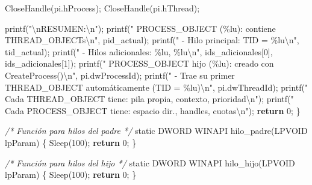 \documentclass[
  spanish,
]{article}
\newenvironment{Shaded}{}{}
\newcommand{\CommentTok}[1]{\textcolor[rgb]{0.38,0.63,0.69}{\textit{#1}}}
\newcommand{\ControlFlowTok}[1]{\textcolor[rgb]{0.00,0.44,0.13}{\textbf{#1}}}
\newcommand{\DataTypeTok}[1]{\textcolor[rgb]{0.56,0.13,0.00}{#1}}
\newcommand{\DecValTok}[1]{\textcolor[rgb]{0.25,0.63,0.44}{#1}}
\newcommand{\NormalTok}[1]{#1}
\newcommand{\OperatorTok}[1]{\textcolor[rgb]{0.40,0.40,0.40}{#1}}
\newcommand{\SpecialCharTok}[1]{\textcolor[rgb]{0.25,0.44,0.63}{#1}}
\newcommand{\StringTok}[1]{\textcolor[rgb]{0.25,0.44,0.63}{#1}}
\begin{document}
\begin{Shaded}
\begin{Highlighting}[]
\NormalTok{    CloseHandle}\OperatorTok{(}\NormalTok{pi}\OperatorTok{.}\NormalTok{hProcess}\OperatorTok{);}
\NormalTok{    CloseHandle}\OperatorTok{(}\NormalTok{pi}\OperatorTok{.}\NormalTok{hThread}\OperatorTok{);}

\NormalTok{    printf}\OperatorTok{(}\StringTok{"}\SpecialCharTok{\textbackslash{}n}\StringTok{RESUMEN:}\SpecialCharTok{\textbackslash{}n}\StringTok{"}\OperatorTok{);}
\NormalTok{    printf}\OperatorTok{(}\StringTok{"  PROCESS\_OBJECT (}\SpecialCharTok{\%lu}\StringTok{): contiene THREAD\_OBJECTs}\SpecialCharTok{\textbackslash{}n}\StringTok{"}\OperatorTok{,}\NormalTok{ pid\_actual}\OperatorTok{);}
\NormalTok{    printf}\OperatorTok{(}\StringTok{"    {-} Hilo principal: TID = }\SpecialCharTok{\%lu\textbackslash{}n}\StringTok{"}\OperatorTok{,}\NormalTok{ tid\_actual}\OperatorTok{);}
\NormalTok{    printf}\OperatorTok{(}\StringTok{"    {-} Hilos adicionales: }\SpecialCharTok{\%lu}\StringTok{, }\SpecialCharTok{\%lu\textbackslash{}n}\StringTok{"}\OperatorTok{,}
\NormalTok{           ids\_adicionales}\OperatorTok{[}\DecValTok{0}\OperatorTok{],}\NormalTok{ ids\_adicionales}\OperatorTok{[}\DecValTok{1}\OperatorTok{]);}
\NormalTok{    printf}\OperatorTok{(}\StringTok{"  PROCESS\_OBJECT hijo (}\SpecialCharTok{\%lu}\StringTok{): creado con CreateProcess()}\SpecialCharTok{\textbackslash{}n}\StringTok{"}\OperatorTok{,}
\NormalTok{           pi}\OperatorTok{.}\NormalTok{dwProcessId}\OperatorTok{);}
\NormalTok{    printf}\OperatorTok{(}\StringTok{"    {-} Trae su primer THREAD\_OBJECT automáticamente (TID = }\SpecialCharTok{\%lu}\StringTok{)}\SpecialCharTok{\textbackslash{}n}\StringTok{"}\OperatorTok{,}
\NormalTok{           pi}\OperatorTok{.}\NormalTok{dwThreadId}\OperatorTok{);}
\NormalTok{    printf}\OperatorTok{(}\StringTok{"  Cada THREAD\_OBJECT tiene: pila propia, contexto, prioridad}\SpecialCharTok{\textbackslash{}n}\StringTok{"}\OperatorTok{);}
\NormalTok{    printf}\OperatorTok{(}\StringTok{"  Cada PROCESS\_OBJECT tiene: espacio dir., handles, cuotas}\SpecialCharTok{\textbackslash{}n}\StringTok{"}\OperatorTok{);}
    \ControlFlowTok{return} \DecValTok{0}\OperatorTok{;}
\OperatorTok{\}}

\CommentTok{/* Función para hilos del padre */}
\DataTypeTok{static}\NormalTok{ DWORD WINAPI hilo\_padre}\OperatorTok{(}\NormalTok{LPVOID lpParam}\OperatorTok{)} \OperatorTok{\{}
\NormalTok{    Sleep}\OperatorTok{(}\DecValTok{100}\OperatorTok{);}
    \ControlFlowTok{return} \DecValTok{0}\OperatorTok{;}
\OperatorTok{\}}

\CommentTok{/* Función para hilos del hijo */}
\DataTypeTok{static}\NormalTok{ DWORD WINAPI hilo\_hijo}\OperatorTok{(}\NormalTok{LPVOID lpParam}\OperatorTok{)} \OperatorTok{\{}
\NormalTok{    Sleep}\OperatorTok{(}\DecValTok{100}\OperatorTok{);}
    \ControlFlowTok{return} \DecValTok{0}\OperatorTok{;}
\OperatorTok{\}}
\end{Highlighting}
\end{Shaded}
\end{document}
